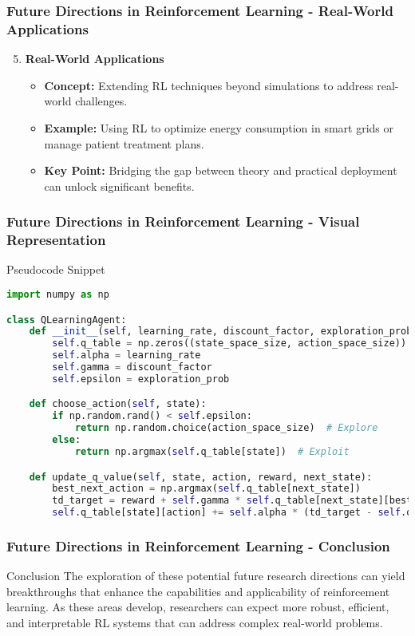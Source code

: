 \documentclass[aspectratio=169]{beamer}
\begin{document}
\begin{frame}
    \frametitle{Future Directions in Reinforcement Learning - Real-World Applications}
    \begin{enumerate}
        \setcounter{enumi}{4}
        \item \textbf{Real-World Applications}
            \begin{itemize}
                \item \textbf{Concept:} Extending RL techniques beyond simulations to address real-world challenges.
                \item \textbf{Example:} Using RL to optimize energy consumption in smart grids or manage patient treatment plans.
                \item \textbf{Key Point:} Bridging the gap between theory and practical deployment can unlock significant benefits.
            \end{itemize}
    \end{enumerate}
\end{frame}

\begin{frame}[fragile]
    \frametitle{Future Directions in Reinforcement Learning - Visual Representation}
    \begin{block}{Pseudocode Snippet}
    \begin{lstlisting}[language=Python]
import numpy as np

class QLearningAgent:
    def __init__(self, learning_rate, discount_factor, exploration_prob):
        self.q_table = np.zeros((state_space_size, action_space_size))
        self.alpha = learning_rate
        self.gamma = discount_factor
        self.epsilon = exploration_prob

    def choose_action(self, state):
        if np.random.rand() < self.epsilon:
            return np.random.choice(action_space_size)  # Explore
        else:
            return np.argmax(self.q_table[state])  # Exploit

    def update_q_value(self, state, action, reward, next_state):
        best_next_action = np.argmax(self.q_table[next_state])
        td_target = reward + self.gamma * self.q_table[next_state][best_next_action]
        self.q_table[state][action] += self.alpha * (td_target - self.q_table[state][action])
    \end{lstlisting}
    \end{block}
\end{frame}

\begin{frame}
    \frametitle{Future Directions in Reinforcement Learning - Conclusion}
    \begin{block}{Conclusion}
        The exploration of these potential future research directions can yield breakthroughs that enhance the capabilities and applicability of reinforcement learning. As these areas develop, researchers can expect more robust, efficient, and interpretable RL systems that can address complex real-world problems.
    \end{block}
\end{frame}
\end{document}
